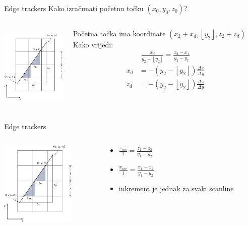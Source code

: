 \documentclass[9pt]{beamer}
\begin{document}
\begin{frame}{Edge trackers}
	Kako izračunati početnu točku $(x_0, y_0, z_0)$?
	\begin{columns}
		\begin{column}{0.48 \textwidth}
			\begin{center}
				\includegraphics[height=4cm]{slike/p05_11.png}
			\end{center}
		\end{column}
		\begin{column}{0.48 \textwidth}
			Početna točka ima koordinate $(x_2+x_d, \left\lfloor y_2\right\rfloor, z_2+z_d)$
			Kako vrijedi:
			\begin{align*}
			\frac{x_d}{y_2-\left\lfloor y_2\right\rfloor} = \frac{x_2-x_1}{y_2-y_1}
			\end{align*}
			\begin{align*}
			x_d &= -(y_2-\left\lfloor y_2\right\rfloor)\frac{\Delta x}{\Delta y} \\
			z_d &= -(y_2-\left\lfloor y_2\right\rfloor)\frac{\Delta z}{\Delta y}
			\end{align*}
		\end{column}
	\end{columns}
\end{frame}

\begin{frame}{Edge trackers}
	\begin{columns}
		\begin{column}{0.48 \textwidth}
			\begin{center}
				\includegraphics[height=4cm]{slike/p05_11.png}
			\end{center}
		\end{column}
		\begin{column}{0.48 \textwidth}
			\begin{itemize}
				\item $\frac{z_{inc}}{1} = \frac{z_1-z_2}{y_1-y_2}$
				\item $\frac{x_{inc}}{1} = \frac{x_1-x_2}{y_1-y_2}$
				\item inkrement je jednak za svaki scanline 
			\end{itemize}
		\end{column}
	\end{columns}
\end{frame}
\end{document}
